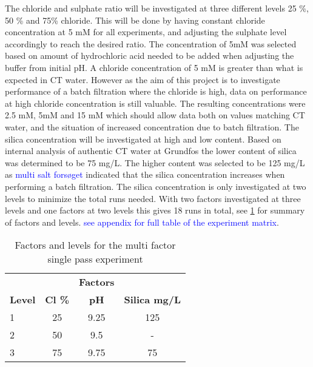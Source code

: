 The chloride and sulphate ratio will be investigated at three different levels 25 \%, 50 \% and 75\% chloride. This will be done by having constant chloride concentration at 5 mM for all experiments, and adjusting the sulphate level accordingly to reach the desired ratio. 
The concentration of 5mM was selected based on amount of hydrochloric acid needed to be added when adjusting the buffer from initial pH. 
A chloride concentration of 5 mM is greater than what is expected in CT water. However as the aim of this project is to investigate performance of a batch filtration where the chloride is high, data on performance at high chloride concentration is still valuable. 
The resulting  concentrations were 2.5 mM, 5mM and 15 mM which should allow data both on values matching CT water, and the situation of increased concentration due to batch filtration. 
The silica concentration will be investigated at high and low content. 
Based on internal analysis of authentic CT water at Grundfos the lower content of silica was determined to be 75 mg/L. 
The higher content was selected to be 125 mg/L as \textcolor{blue}{multi salt forsøget} indicated that the silica concentration increases when performing a batch filtration. 
The silica concentration is only investigated at two levels to minimize the total runs needed.
With two factors investigated at three levels and one factors at two levels this gives 18 runs in total, see \cref{tab:SPRR_factors_levels} for summary of factors and levels.  \textcolor{blue}{see appendix for full table of the experiment matrix}.


\begin{table}[H]
\centering
\caption{Factors and levels for the multi factor single pass experiment}
\label{tab:SPRR_factors_levels}
\begin{tabular}{l|ccc}
\rowcolor{gray!50}
  &  & \textbf{Factors} &   \\ 
  \rowcolor{gray!50}
\textbf{Level}   & \textbf{Cl \%} & \textbf{pH} & \textbf{Silica mg/L}  \\ \hline
1   & 25             & 9.25  & 125    \\
2   & 50               & 9.5   & -      \\
3  & 75               & 9.75  & 75    \\
\end{tabular}
\end{table}



